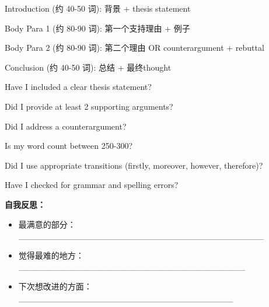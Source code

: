 \documentclass[12pt]{ctexart}
\begin{document}
\begin{writingscaffold}
  
  
  \structureguidestart
    \item Introduction (约 40-50 词): 背景 + thesis statement
    \item Body Para 1 (约 80-90 词): 第一个支持理由 + 例子
    \item Body Para 2 (约 80-90 词): 第二个理由 OR counterargument + rebuttal
    \item Conclusion (约 40-50 词): 总结 + 最终thought
  \endsstructureguide
  
  \checkliststart
    \item Have I included a clear thesis statement?
    \item Did I provide at least 2 supporting arguments?
    \item Did I address a counterargument?
    \item Is my word count between 250-300?
    \item Did I use appropriate transitions (firstly, moreover, however, therefore)?
    \item Have I checked for grammar and spelling errors?
  \endchecklist
  
  \ansspace[30cm]
  
  \selfreflectionstart
    \textbf{自我反思：}
    \begin{itemize}
      \item 最满意的部分：________________________________________
      \item 觉得最难的地方：_____________________________________
      \item 下次想改进的方面：___________________________________
    \end{itemize}
  \selfreflectionend
\end{writingscaffold}
\end{document}

